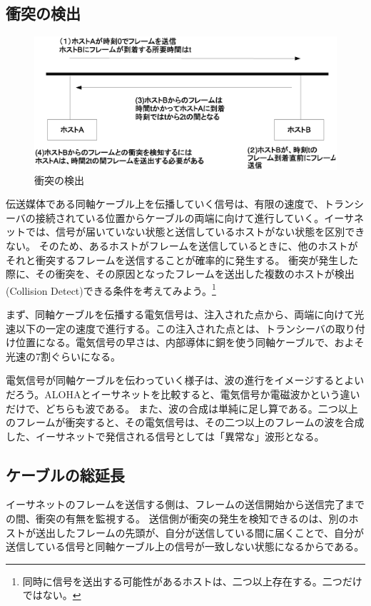 \subsection{衝突の検出}

\begin{figure}[htbp]
	\includegraphics[width=12cm,clip]{draw/colision.eps}
	\caption{衝突の検出}
	\label{fig:colision}
\end{figure}


伝送媒体である同軸ケーブル上を伝播していく信号は、有限の速度で、トランシーバの接続されている位置からケーブルの両端に向けて進行していく。イーサネットでは、信号が届いていない状態と送信しているホストがない状態を区別できない。
そのため、あるホストがフレームを送信しているときに、他のホストがそれと衝突するフレームを送信することが確率的に発生する。
衝突が発生した際に、その衝突を、その原因となったフレームを送出した複数のホストが検出(Collision Detect)できる条件を考えてみよう。\footnote{同時に信号を送出する可能性があるホストは、二つ以上存在する。二つだけではない。}

まず、同軸ケーブルを伝播する電気信号は、注入された点から、両端に向けて光速以下の一定の速度で進行する。この注入された点とは、トランシーバの取り付け位置になる。電気信号の早さは、内部導体に銅を使う同軸ケーブルで、およそ光速の7割ぐらいになる。

電気信号が同軸ケーブルを伝わっていく様子は、波の進行をイメージするとよいだろう。ALOHAとイーサネットを比較すると、電気信号か電磁波かという違いだけで、どちらも波である。
また、波の合成は単純に足し算である。二つ以上のフレームが衝突すると、その電気信号は、その二つ以上のフレームの波を合成した、イーサネットで発信される信号としては「異常な」波形となる。

\subsection{ケーブルの総延長}

イーサネットのフレームを送信する側は、フレームの送信開始から送信完了までの間、衝突の有無を監視する。
送信側が衝突の発生を検知できるのは、別のホストが送出したフレームの先頭が、自分が送信している間に届くことで、自分が送信している信号と同軸ケーブル上の信号が一致しない状態になるからである。

